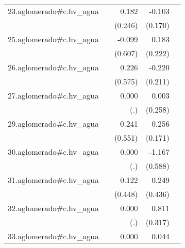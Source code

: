 {\begin{longtable}{l*{4}{D{.}{.}{-1}}}
\addlinespace
23.aglomerado#c.hv\_agua&                     &       0.182         &      -0.103         &                     \\
            &                     &     (0.246)         &     (0.170)         &                     \\
\addlinespace
25.aglomerado#c.hv\_agua&                     &      -0.099         &       0.183         &                     \\
            &                     &     (0.607)         &     (0.222)         &                     \\
\addlinespace
26.aglomerado#c.hv\_agua&                     &       0.226         &      -0.220         &                     \\
            &                     &     (0.575)         &     (0.211)         &                     \\
\addlinespace
27.aglomerado#c.hv\_agua&                     &       0.000         &       0.003         &                     \\
            &                     &         (.)         &     (0.258)         &                     \\
\addlinespace
29.aglomerado#c.hv\_agua&                     &      -0.241         &       0.256         &                     \\
            &                     &     (0.551)         &     (0.171)         &                     \\
\addlinespace
30.aglomerado#c.hv\_agua&                     &       0.000         &      -1.167\sym{*}  &                     \\
            &                     &         (.)         &     (0.588)         &                     \\
\addlinespace
31.aglomerado#c.hv\_agua&                     &       0.122         &       0.249         &                     \\
            &                     &     (0.448)         &     (0.436)         &                     \\
\addlinespace
32.aglomerado#c.hv\_agua&                     &       0.000         &       0.811\sym{*}  &                     \\
            &                     &         (.)         &     (0.317)         &                     \\
\addlinespace
33.aglomerado#c.hv\_agua&                     &       0.000         &       0.044         &                     \\

\end{longtable}}
